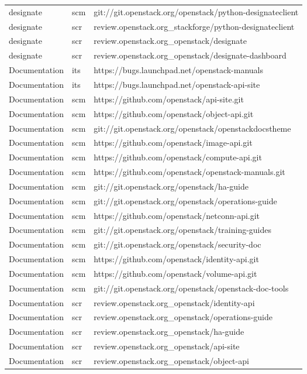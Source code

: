 \begin{center}
\begin{longtable}{|p{4cm}|p{1cm}|p{10cm}|}
designate&scm&git://git.openstack.org/openstack/python-designateclient\\ 
designate&scr&review.openstack.org\_stackforge/python-designateclient\\ 
designate&scr&review.openstack.org\_openstack/designate\\ 
designate&scr&review.openstack.org\_openstack/designate-dashboard\\ 
Documentation&its&https://bugs.launchpad.net/openstack-manuals\\ 
Documentation&its&https://bugs.launchpad.net/openstack-api-site\\ 
Documentation&scm&https://github.com/openstack/api-site.git\\ 
Documentation&scm&https://github.com/openstack/object-api.git\\ 
Documentation&scm&git://git.openstack.org/openstack/openstackdocstheme\\ 
Documentation&scm&https://github.com/openstack/image-api.git\\ 
Documentation&scm&https://github.com/openstack/compute-api.git\\ 
Documentation&scm&https://github.com/openstack/openstack-manuals.git\\ 
Documentation&scm&git://git.openstack.org/openstack/ha-guide\\ 
Documentation&scm&git://git.openstack.org/openstack/operations-guide\\ 
Documentation&scm&https://github.com/openstack/netconn-api.git\\ 
Documentation&scm&git://git.openstack.org/openstack/training-guides\\ 
Documentation&scm&git://git.openstack.org/openstack/security-doc\\ 
Documentation&scm&https://github.com/openstack/identity-api.git\\ 
Documentation&scm&https://github.com/openstack/volume-api.git\\ 
Documentation&scm&git://git.openstack.org/openstack/openstack-doc-tools\\ 
Documentation&scr&review.openstack.org\_openstack/identity-api\\ 
Documentation&scr&review.openstack.org\_openstack/operations-guide\\ 
Documentation&scr&review.openstack.org\_openstack/ha-guide\\ 
Documentation&scr&review.openstack.org\_openstack/api-site\\ 
Documentation&scr&review.openstack.org\_openstack/object-api\\ 

\end{longtable}
\end{center}
